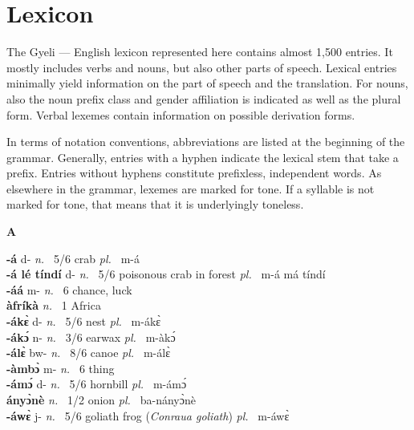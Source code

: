 \chapter{Lexicon}
\label{sec:AppendixIII}


The Gyeli --- English lexicon represented here contains almost 1,500 entries. It mostly includes verbs and nouns, but also other parts of speech. Lexical entries minimally yield information on the part of speech and the translation. For nouns, also the noun prefix class and gender affiliation is indicated as well as the plural form. Verbal lexemes contain information on possible derivation forms.

In terms of notation conventions, abbreviations are listed at the beginning of the grammar. Generally, entries with a hyphen indicate the lexical stem that take a prefix. Entries without hyphens constitute prefixless, independent words.
As elsewhere in the grammar, lexemes are marked for tone. If a syllable is not marked for tone, that means that it is underlyingly toneless.

\twocolumn
\setlength{\columnsep}{.3cm}
\sloppy





\noindent \large {\bfseries A}\normalsize\\
\medskip

\noindent
{\bfseries -á} d- {\itshape n.~} 5/6 crab {\itshape pl.~} m-á    \\ 
{\bfseries -á lé tíndí} d- {\itshape n.~} 5/6 poisonous crab in forest  {\itshape pl.~} m-á má tíndí  \\ 
{\bfseries -áá} m- {\itshape n.~} 6 chance, luck    \\ 
{\bfseries  àfríkà}  {\itshape n.~} 1 Africa    \\ 
{\bfseries -ákɛ̀} d- {\itshape n.~} 5/6 nest {\itshape pl.~} m-ákɛ̀    \\ 
{\bfseries -ákɔ́} n- {\itshape n.~} 3/6 earwax {\itshape pl.~} m-àkɔ́    \\ 
{\bfseries -álɛ̀ } bw- {\itshape n.~} 8/6 canoe {\itshape pl.~} m-álɛ̀    \\ 
{\bfseries -àmbɔ̀} m- {\itshape n.~} 6 thing    \\ 
{\bfseries -ámɔ́} d- {\itshape n.~} 5/6 hornbill {\itshape pl.~} m-ámɔ́   \\ 
{\bfseries  ányɔ̀nè}  {\itshape n.~} 1/2  onion {\itshape pl.~} ba-nányɔ̀nè    \\ 
{\bfseries -áwɛ̀} j- {\itshape n.~} 5/6 goliath frog ({\itshape Conraua goliath}) {\itshape pl.~} m-áwɛ̀    \\ 

